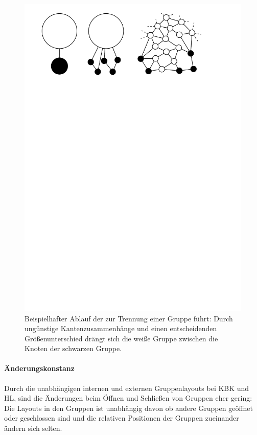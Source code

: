\begin{figure}[h]
\begin{center}
	\includegraphics[width=\textwidth]{Pics/uniform_trenn.pdf}
	\caption{Beispielhafter Ablauf der zur Trennung einer Gruppe führt: Durch ungünstige Kantenzusammenhänge und einen entscheidenden Größenunterschied drängt sich die weiße Gruppe zwischen die Knoten der schwarzen Gruppe.}
	\label{Uniform-Trenn-Skizze}
\end{center}
\end{figure}


\paragraph*{Änderungskonstanz}
Durch die unabhängigen internen und externen Gruppenlayouts bei KBK und HL, sind die Änderungen beim Öffnen und Schließen von Gruppen eher gering: Die Layouts in den Gruppen ist unabhängig davon ob andere Gruppen geöffnet oder geschlossen sind und die relativen Positionen der Gruppen zueinander ändern sich selten.

